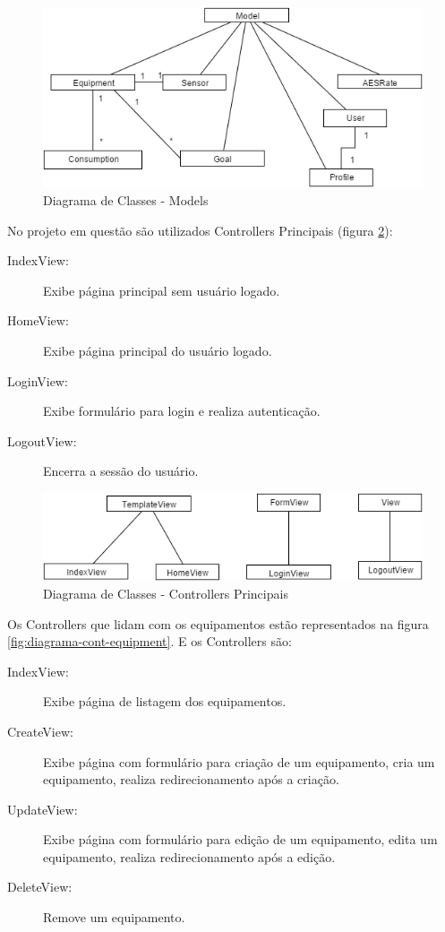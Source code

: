 \begin{figure}[H]
\centering
\includegraphics[width=14cm,keepaspectratio]{figuras/diagrama_models.png}
\caption{\label{fig:diagrama-models} Diagrama de Classes - Models}
\end{figure}

No projeto em questão são utilizados Controllers Principais (figura \ref{fig:diagrama-cont-principal}):
\begin{description}
	\item[IndexView:] Exibe página principal sem usuário logado.
	\item[HomeView:] Exibe página principal do usuário logado.
	\item[LoginView:] Exibe formulário para login e realiza autenticação.
	\item[LogoutView:] Encerra a sessão do usuário.
\end{description} 

\begin{figure}[H]
\centering
\includegraphics[width=14cm,keepaspectratio]{figuras/diagrama_cont_principal.png}
\caption{\label{fig:diagrama-cont-principal} Diagrama de Classes - Controllers Principais}
\end{figure}

Os Controllers que lidam com os equipamentos estão representados na figura \ref{fig:diagrama-cont-equipment}. E os Controllers são:
\begin{description}
	\item[IndexView:] Exibe página de listagem dos equipamentos.
	\item[CreateView:] Exibe página com formulário para criação de um equipamento, cria um equipamento, realiza redirecionamento após a criação.
	\item[UpdateView:] Exibe página com formulário para edição de um equipamento, edita um equipamento, realiza redirecionamento após a edição.
	\item[DeleteView:] Remove um equipamento.
\end{description} 

